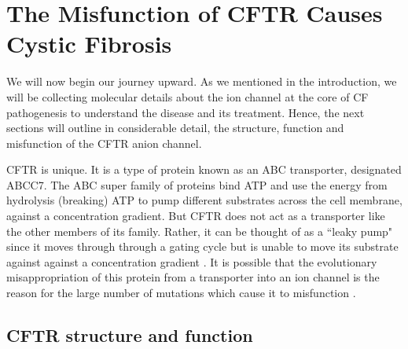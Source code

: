 \section{The Misfunction of CFTR Causes Cystic Fibrosis}

We will now begin our journey upward. As we mentioned in the introduction, we will be collecting molecular details about the ion channel at the core of CF pathogenesis to understand the disease and its treatment. Hence, the next sections will outline in considerable detail, the structure, function and misfunction of the CFTR anion channel. 

CFTR is unique. It is a type of protein known as an ABC transporter, designated ABCC7. The ABC super family of proteins bind ATP and use the energy from hydrolysis (breaking) ATP to pump different substrates across the cell membrane, against a concentration gradient. But CFTR does not act as a transporter like the other members of its family. Rather, it can be thought of as a ``leaky pump" since it moves through through a gating cycle but is unable to move its substrate against against a concentration gradient \cite{gadsby2006,linsdell2018}. It is possible that the evolutionary misappropriation of this protein from a transporter into an ion channel is the reason for the large number of mutations which cause it to misfunction \cite{infield2021}. 


\subsection{CFTR structure and function}

